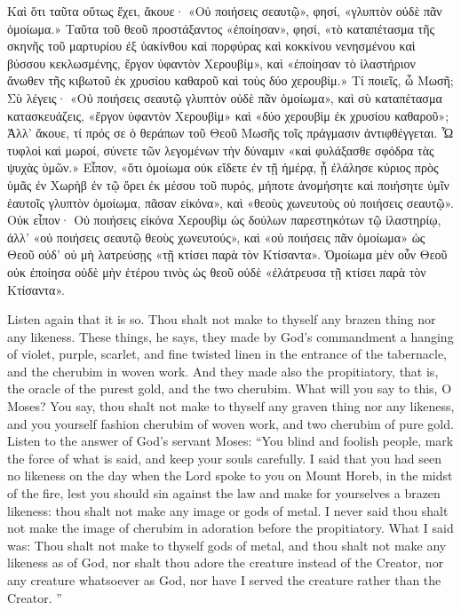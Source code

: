 \documentclass[10pt]{book}
\newcommand{\switchgreek}[1][]{\selectlanguage{polutonikogreek} \switchcolumn*[#1]}
\newcommand{\switchenglish}{\selectlanguage{english} \switchcolumn}
\begin{document}
\begin{paracol}{2}
\switchgreek

Καὶ ὅτι ταῦτα οὕτως ἔχει, ἄκουε· «Οὐ ποιήσεις σεαυτῷ», φησί, «γλυπτὸν οὐδὲ πᾶν
ὁμοίωμα.» Ταῦτα τοῦ θεοῦ προστάξαντος «ἐποίησαν», φησί, «τὸ καταπέτασμα τῆς
σκηνῆς τοῦ μαρτυρίου ἐξ ὑακίνθου καὶ πορφύρας καὶ κοκκίνου νενησμένου καὶ
βύσσου κεκλωσμένης, ἔργον ὑφαντὸν Χερουβίμ», καὶ «ἐποίησαν τὸ ἱλαστήριον
ἄνωθεν τῆς κιβωτοῦ ἐκ χρυσίου καθαροῦ καὶ τοὺς δύο χερουβίμ.» Τί ποιεῖς, ὦ
Μωσῆ; Σὺ λέγεις· «Οὐ ποιήσεις σεαυτῷ γλυπτὸν οὐδὲ πᾶν ὁμοίωμα», καὶ σὺ
καταπέτασμα κατασκευάζεις, «ἔργον ὑφαντὸν Χερουβὶμ» καὶ «δύο χερουβὶμ ἐκ
χρυσίου καθαροῦ»; Ἀλλ’ ἄκουε, τί πρός σε ὁ θεράπων τοῦ Θεοῦ Μωσῆς τοῖς
πράγμασιν ἀντιφθέγγεται. Ὦ τυφλοὶ καὶ μωροί, σύνετε τῶν λεγομένων τὴν δύναμιν
«καὶ φυλάξασθε σφόδρα τὰς ψυχὰς ὑμῶν.» Εἶπον, «ὅτι ὁμοίωμα οὐκ εἴδετε ἐν τῇ
ἡμέρᾳ, ᾗ ἐλάλησε κύριος πρὸς ὑμᾶς ἐν Χωρὴβ ἐν τῷ ὄρει ἐκ μέσου τοῦ πυρός,
μήποτε ἀνομήσητε καὶ ποιήσητε ὑμῖν ἑαυτοῖς γλυπτὸν ὁμοίωμα, πᾶσαν εἰκόνα», καὶ
«θεοὺς χωνευτοὺς οὐ ποιήσεις σεαυτῷ». Οὐκ εἶπον· Οὐ ποιήσεις εἰκόνα Χερουβὶμ
ὡς δούλων παρεστηκότων τῷ ἱλαστηρίῳ, ἀλλ’ «οὐ ποιήσεις σεαυτῷ θεοὺς
χωνευτούς», καὶ «οὐ ποιήσεις πᾶν ὁμοίωμα» ὡς Θεοῦ οὐδ’ οὐ μὴ λατρεύσῃς «τῇ
κτίσει παρὰ τὸν Κτίσαντα». Ὁμοίωμα μὲν οὖν Θεοῦ οὐκ ἐποίησα οὐδὲ μὴν ἑτέρου
τινὸς ὡς θεοῦ οὐδὲ «ἐλάτρευσα τῇ κτίσει παρὰ τὸν Κτίσαντα».

\switchenglish

Listen again that it is so. Thou shalt not 
make to thyself any brazen thing nor any 
likeness. These things, he says, they made 
by God's commandment a hanging of violet, 
purple, scarlet, and fine twisted linen in the 
entrance of the tabernacle, and the cherubim 
in woven work. And they made also the 
propitiatory, that is, the oracle of the purest 
gold, and the two cherubim. What will you 
say to this, O Moses? You say, thou shalt 
not make to thyself any graven thing nor any 
likeness, and you yourself fashion cherubim of 
woven work, and two cherubim of pure gold. 
Listen to the answer of God's servant Moses: 
``You blind and foolish people, mark the force 
of what is said, and keep your souls carefully. 
I said that you had seen no likeness on the 
day when the Lord spoke to you on Mount 
Horeb, in the midst of the fire, lest you should 
sin against the law and make for yourselves a 
brazen likeness: thou shalt not make any 
image or gods of metal. I never said thou 
shalt not make the image of cherubim in 
adoration before the propitiatory. What I 
said was: Thou shalt not make to thyself 
gods of metal, and thou shalt not make any 
likeness as of God, nor shalt thou adore 
the creature instead of the Creator, nor 
any creature whatsoever as God, nor have 
I served the creature rather than the Creator. ''


\end{paracol}
\end{document}
